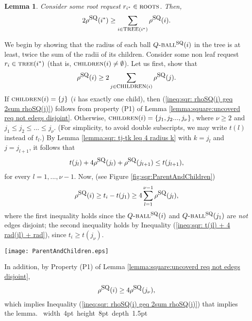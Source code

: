\documentclass[11pt]{article}
\newtheorem{lem}[theorem]{Lemma}
\def\proof{\par\noindent{\bf Proof:~}}
\def\blackslug{\hbox{\hskip 1pt \vrule width 4pt height 8pt
    depth 1.5pt \hskip 1pt}}
\def\QED{\quad\blackslug\lower 8.5pt\null\par}
\newcommand{\rr}{r}
\newcommand{\rhoSQ}[0]{\rho^{\mbox{\small\upshape SQ}}}
\newcommand{\Tree}[0]{\mbox{\sc tree}}
\newcommand{\suns}[0]{\mbox{\sc children}}
\newcommand{\roots}[0]{\mbox{\sc roots}}
\newcommand{\SQball}[0]{Q{\mbox{\sc -ball}}^{\mbox{\sc sq}}}
\begin{document}
\begin{lem}
Consider some root request $\rr_{i^*}\in\roots$.
Then,
$$
2\rhoSQ(i^*)\geq \sum_{i\in\Tree(i^*)}\rhoSQ(i).
$$
\label{lema:sqr:root radi geq sum of its children}
\end{lem}
\proof
We begin by showing that the radius of each ball $\SQball(i)$ in the tree is at least, twice the sum of the radii of its children.
Consider some non leaf request $\rr_i\in\Tree(i^*)$ (that is, $\suns(i)\not=\emptyset$).
Let us first, show that
\begin{eqnarray}
\rhoSQ(i)\geq 2\sum_{j\in\suns(i)}\rhoSQ(j).
\label{ineq:sqr: rhoSQ(i) geq 2sum rhoSQ(j)}
\end{eqnarray}
If $\suns(i)=\{j\}$ ($i$ has exactly one child), then (\ref{ineq:sqr: rhoSQ(i) geq 2sum rhoSQ(j)}) follows from
property (P1) of Lemma \ref{lemma:square:uncoverd req not edegs disjoint}.
Otherwise, $\suns(i)=\{j_1,j_2...,j_\nu\}$, where $\nu\geq 2$ and $j_1\leq j_2\leq...\leq j_\nu$.
(For simplicity, to avoid double subscripts, we may write $t(l)$ instead of $t_l$.)
By Lemma \ref{lemma:sqr: tj-tk leq 4 radius k} with $k=j_l$ and $j=j_{l+1}$, it follows that
\begin{eqnarray}
t(j_{l})+4\rhoSQ(j_l)+\rhoSQ(j_{l+1})\leq t(j_{l+1}),
\label{ineq:sqr: t(jl) + 4 rad(jl) + rad}
\end{eqnarray}
for every $l=1,...,\nu-1$.
Now, (see Figure \ref{fig:sqr:ParentAndChildren})
\begin{eqnarray}
\rhoSQ(i)\geq t_i-t(j_1) \geq 4\sum_{l=1}^{\nu-1}\rhoSQ(j_l),
\label{ineq:sqr:rad(i) geq ti-tj1 geq sum}
\end{eqnarray}
where the first inequality holds since the $\SQball(i)$ and $\SQball(j_1)$ are {\em not} edges disjoint;
the second inequality holds by Inequality (\ref{ineq:sqr: t(jl) + 4 rad(jl) + rad}), since $t_i\geq t(j_\nu)$.
\begin{figure*}
\begin{center}
\texttt{[image: ParentAndChildren.eps]}
\end{center}
\caption{\sf Geometric vision on a parent and its children relationships.
\label{fig:sqr:ParentAndChildren}
}
\end{figure*}
In addition, by Property (P1) of Lemma
\ref{lemma:square:uncoverd req not edegs disjoint},
\begin{eqnarray}
\rhoSQ(i)\geq 4\rhoSQ(j_\nu),
\end{eqnarray}
which implies Inequality (\ref{ineq:sqr: rhoSQ(i) geq 2sum rhoSQ(j)})
that implies the lemma.
\QED
\end{document}
